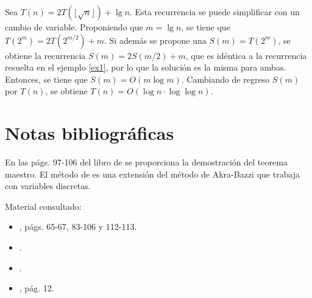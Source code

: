 \begin{expl}
    Sea $T(n)=2T(\lfloor \sqrt{n} \rfloor)+\lg{n}$. Esta recurrencia se 
    puede simplificar con un cambio de variable. Proponiendo que $m=\lg{n}$,
    se tiene que $T(2^m)=2T(2^{m/2})+m$. Si además se propone una 
    $S(m)=T(2^m)$, se obtiene la recurrencia $S(m)=2S(m/2)+m$, que
    es idéntica a la recurrencia resuelta en el ejemplo \ref{ex1}, por
    lo que la solución es la misma para ambas. Entonces, se tiene que 
    $S(m)=O(m\log m)$. Cambiando de regreso $S(m)$ por $T(n)$, se obtiene
    $T(n)=O(\log{n}\cdot\log\log{n})$.
    \exend
\end{expl}

\section*{Notas bibliográficas}

En las págs. 97-106 del libro de \textcite{cormen_introduction_2009} se
proporciona la demostración del teorema maestro. 
El método de \textcite{drmota_master_2013} es una extensión del método de 
Akra-Bazzi que trabaja con variables discretas. 

Material consultado:
\begin{itemize}
    \item \textcite{cormen_introduction_2009}, págs. 65-67, 83-106 y 112-113.
    \item \textcite{akra_solution_1998}.
    \item \textcite{drmota_master_2013}.
    \item \textcite{goodrich_algorithm_2001}, pág. 12.
\end{itemize}
